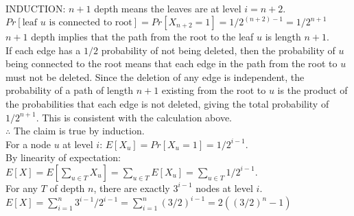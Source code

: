 \documentclass[10pt,letterpaper]{article}
\begin{document}
INDUCTION: $n+1$ depth means the leaves are at level $i=n+2$.\\
$Pr[\text{leaf $u$ is connected to root}]=Pr[X_{n+2}=1]=1/2^{(n+2)-1}=1/2^{n+1}$\\
$n+1$ depth implies that the path from the root to the leaf $u$ is length $n+1$.\\
If each edge has a $1/2$ probability of not being deleted, then the probability of $u$ being connected to the root means that each edge in the path from the root to $u$ must not be deleted. Since the deletion of any edge is independent, the probability of a path of length $n+1$ existing from the root to $u$ is the product of the probabilities that each edge is not deleted, giving the total probability of $1/2^{n+1}$. This is consistent with the calculation above.\\
$\therefore$ The claim is true by induction.\\
For a node $u$ at level $i$: $E[X_u]=Pr[X_u=1]=1/2^{i-1}$.\\
By linearity of expectation: $E[X]=E[\sum_{u \in T}X_u]=\sum_{u \in T}E[X_u] = \sum_{u \in T}1/2^{i-1}$.\\ 
For any $T$ of depth $n$, there are exactly $3^{i-1}$ nodes at level $i$.\\
$E[X]=\sum_{i=1}^{n}3^{i-1}/2^{i-1}=\sum_{i=1}^{n}(3/2)^{i-1}=2((3/2)^n-1)$

\pagebreak

\end{document}
